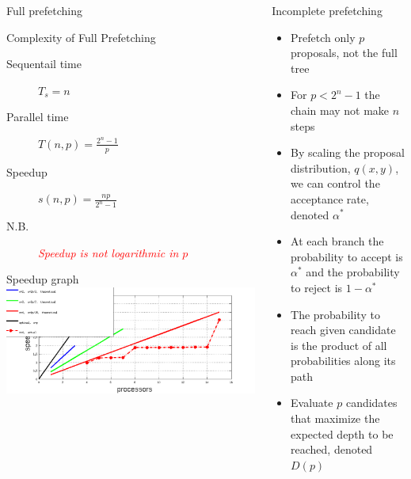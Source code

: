 \documentclass[final]{beamer}
\begin{document}
\begin{frame}[t]{}
\begin{columns}[t]
\begin{column}{0.3\textwidth}
\begin{block}{Full prefetching}
        \end{block}

        \begin{block}{Complexity of Full Prefetching}
            \begin{description}
                \item[Sequentail time] $\displaystyle T_s = n$ %
                \item[Parallel time] $\displaystyle T(n,p) = \frac{2^n-1}{p}$
                \item[Speedup] $\displaystyle s(n,p) = \frac{np}{2^n-1}$
                \item[N.B.] \textit{\textcolor{red}{Speedup  is not logarithmic in $p$}}
            \end{description}
        \end{block}

        \begin{block}{Speedup graph}
        \includegraphics[width=1\textwidth]{speedup-full.png}
        \end{block}
      
    \end{column}
    \begin{column}{0.3\textwidth}

       \begin{block}{Incomplete prefetching}
            \begin{itemize}
            \item Prefetch only $p$ proposals, not the full tree
            \item For $p<2^n-1$ the chain may not make $n$ steps
            \item By scaling the proposal distribution, $q(x,y)$, we can 
                control the acceptance rate, denoted $\alpha^*$
            \item At each branch the probability to accept is $\alpha^*$ and
                the probability to reject is $1-\alpha^*$
            \item The probability to reach given candidate is the product
                of all probabilities along its path
            \item Evaluate $p$ candidates that maximize the expected
                depth to be reached, denoted $D(p)$
            \end{itemize}
        \end{block}


\end{column}
\end{columns}
\end{frame}
\end{document}

